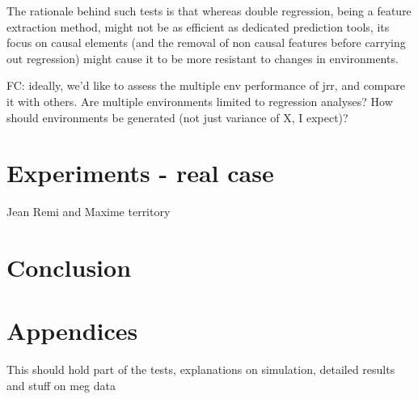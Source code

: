 \documentclass{article}
\begin{document}
The rationale behind such tests is that whereas double regression, being a feature extraction method, might not be as efficient as dedicated prediction tools, its focus on causal elements (and the removal of non causal features before carrying out regression) might cause it to be more resistant to changes in environments.

FC: ideally, we'd like to assess the multiple env performance of jrr, and compare it with others.
%
Are multiple environments limited to regression analyses? How should environments be generated (not just variance of X, I expect)?

\section{Experiments - real case}
Jean Remi and Maxime territory

\section{Conclusion}

\clearpage
\newpage




\section{Appendices}

This should hold part of the tests, explanations on simulation, detailed results and stuff on meg data
\end{document}
